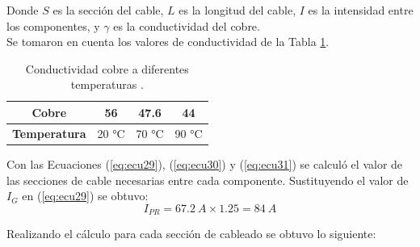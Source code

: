 Donde $S$ es la sección del cable, $L$ es la longitud del cable, $I$ es la intensidad entre los componentes, y $\gamma$ es la conductividad del cobre.\\

Se tomaron en cuenta los valores de conductividad de la Tabla \ref{tab:2}.

\begin{table}[H]
	\centering
	\caption{Conductividad cobre a diferentes temperaturas \cite{DDE7}. }
	\begin{tabular}{|c|c|c|c|}
		\hline
		\textbf{Cobre} & 56    & 47.6  & 44 \\
		\hline
		\textbf{Temperatura} & 20 °C & 70 °C & 90 °C \\
		\hline
	\end{tabular}%
	\label{tab:2}%
\end{table}%

Con las Ecuaciones (\ref{eq:ecu29}), (\ref{eq:ecu30}) y (\ref{eq:ecu31}) se calculó el valor de las secciones de cable necesarias entre cada componente. Sustituyendo el valor de $ I_G $ en (\ref{eq:ecu29}) se obtuvo:
\begin{equation}\label{eq:ecu29sust}
I_{PR} = 67.2 \ A \times 1.25 = 84 \ A
\end{equation}

Realizando el cálculo para cada sección de cableado se obtuvo lo siguiente:

